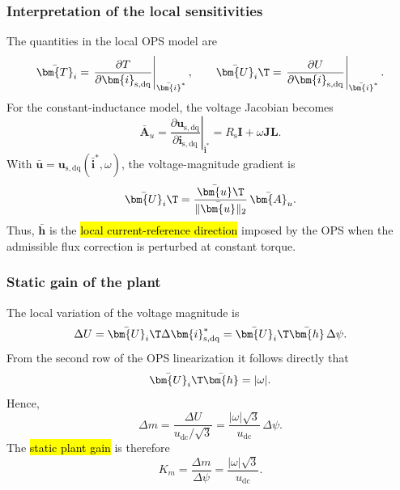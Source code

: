 \begin{frame}
    \frametitle{Interpretation of the local sensitivities}
    The quantities in the local OPS model are
    \begin{equation}
        \bar{\bm{T}}_i = \left.\frac{\partial T}{\partial \bm{i}_{\mathrm{s,dq}}}\right|_{\bar{\bm{i}}^*},
        \qquad
        \bar{\bm{U}}_i\T = \left.\frac{\partial U}{\partial \bm{i}_{\mathrm{s,dq}}}\right|_{\bar{\bm{i}}^*} .
    \end{equation}
    For the constant-inductance model, the voltage Jacobian becomes
    \begin{equation}
        \bar{\bm{A}}_u
        = \left.\frac{\partial \bm{u}_{\mathrm{s,dq}}}{\partial \bm{i}_{\mathrm{s,dq}}}\right|_{\bar{\bm{i}}^*}
        = R_{\mathrm{s}}\bm{I} + \omega\bm{J}\bm{L} .
    \end{equation}
    With $\bar{\bm{u}} = \bm{u}_{\mathrm{s,dq}}(\bar{\bm{i}}^*,\omega)$, the voltage-magnitude gradient is
    \begin{equation}
        \bar{\bm{U}}_i\T = \frac{\bar{\bm{u}}\T}{\|\bar{\bm{u}}\|_2}\,\bar{\bm{A}}_u .
    \end{equation}
    Thus, $\bar{\bm{h}}$ is the \hl{local current-reference direction} imposed by the OPS when the admissible flux correction is perturbed at constant torque.
\end{frame}

\begin{frame}
    \frametitle{Static gain of the plant}
    The local variation of the voltage magnitude is
    \begin{equation}
        \Delta U = \bar{\bm{U}}_i\T\Delta \bm{i}_{\mathrm{s,dq}}^*
        = \bar{\bm{U}}_i\T\bar{\bm{h}}\,\Delta \psi .
    \end{equation}
    From the second row of the OPS linearization it follows directly that
    \begin{equation}
        \bar{\bm{U}}_i\T\bar{\bm{h}} = |\omega| .
    \end{equation}
    Hence,
    \begin{equation}
        \Delta m = \frac{\Delta U}{u_{\mathrm{dc}}/\sqrt{3}}
        = \frac{|\omega|\sqrt{3}}{u_{\mathrm{dc}}}\,\Delta \psi .
    \end{equation}
    The \hl{static plant gain} is therefore
    \begin{equation}
        K_{m} = \frac{\Delta m}{\Delta \psi}
        = \frac{|\omega|\sqrt{3}}{u_{\mathrm{dc}}} .
    \end{equation}
\end{frame}

